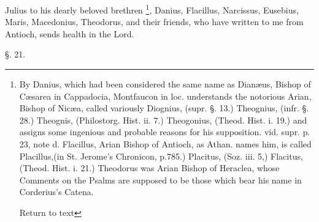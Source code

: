 Julius to his dearly beloved brethren \footnote{By Danius, which had been considered the same name as Dianæus, Bishop
of Cæsarea in Cappadocia, Montfaucon in loc. understands the
notorious Arian, Bishop of Nicæa, called variously Diognius, (supr.
§. 13.) Theognius, (infr. §. 28.) Theognis, (Philostorg. Hist. ii.
7.) Theogonius, (Theod. Hist. i. 19.) and assigns some ingenious and
probable reasons for his supposition. vid. supr. p. 23, note d.
Flacillus, Arian Bishop of Antioch, as Athan. names him, is called
Placillus,(in St. Jerome's Chronicon, p.785.) Placitus, (Soz. iii. 5,)
Flacitus, (Theod. Hist. i. 21.) Theodorus was Arian Bishop of Heraclea,
whose Comments on the Psalms are supposed to be those which bear his
name in Corderius's Catena.

Return to text}, Danius, Flacillus, Narcissus, Eusebius, Maris, Macedonius,
Theodorus, and their friends, who have written to me from
Antioch, sends health in the Lord.

§. 21.

